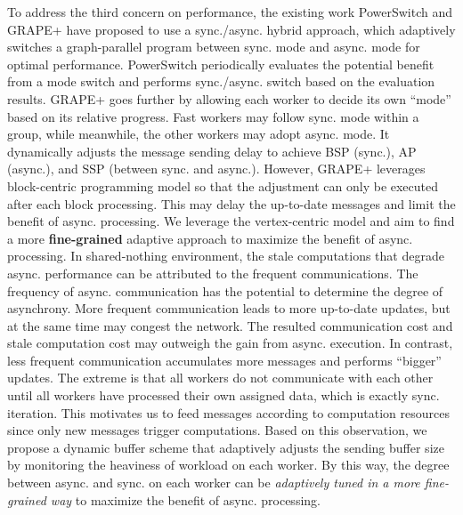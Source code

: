 To address the third concern on performance, the existing work PowerSwitch \cite{Xie2015SYNC} and GRAPE+ \cite{Fan2018Adaptive} have proposed to use a sync./async. hybrid approach, which adaptively switches a graph-parallel program between sync. mode and async. mode for optimal performance. PowerSwitch \cite{Xie2015SYNC} periodically evaluates the potential benefit from a mode switch and performs sync./async. switch based on the evaluation results. GRAPE+ \cite{Fan2018Adaptive} goes further by allowing each worker to decide its own ``mode'' based on its relative progress. Fast workers may follow sync. mode within a group, while meanwhile, the other workers may adopt async. mode. It dynamically adjusts the message sending delay to achieve BSP (sync.), AP (async.), and SSP (between sync. and async.). However, GRAPE+ leverages block-centric programming model so that the adjustment can only be executed after each block processing. This may delay the up-to-date messages and limit the benefit of async. processing. We leverage the vertex-centric model and aim to find a more \textbf{fine-grained} adaptive approach to maximize the benefit of async. processing. In shared-nothing environment, the stale computations that degrade async. performance can be attributed to the frequent communications. The frequency of async. communication has the potential to determine the degree of asynchrony. More frequent communication leads to more up-to-date updates, but at the same time may congest the network. The resulted communication cost and stale computation cost may outweigh the gain from async. execution. In contrast, less frequent communication accumulates more messages and performs ``bigger'' updates. The extreme is that all workers do not communicate with each other until all workers have processed their own assigned data, which is exactly sync. iteration. This motivates us to feed messages according to computation resources since only new messages trigger computations. Based on this observation, we propose a dynamic buffer scheme that adaptively adjusts the sending buffer size by monitoring the heaviness of workload on each worker. By this way, the degree between async. and sync. on each worker can be \emph{adaptively tuned in a more fine-grained way} to maximize the benefit of async. processing.


